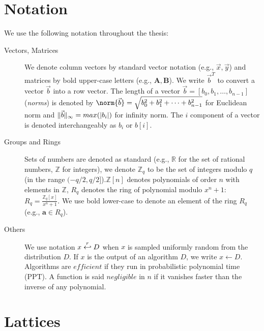 \section{Notation}
\label{sec:defGeneral}
We use the following notation throughout the thesis:
\begin{description}
\item[Vectors, Matrices] We denote column vectors by standard vector notation
  (e.g., \(\vec{x}, \vec{y}\)) and matrices by bold upper-case letters (e.g.,
  \(\mathbf{A}, \mathbf{B}\)). We write \(\vec{b}^{T}\) to convert a vector
  \(\vec{b}\) into a row vector. The length of a vector
  \(\vec{b} = [b_{0}, b_{1}, \dots, b_{n-1}]\) (\textit{norms}) is denoted by
  \(\norm{\vec{b}} = \sqrt{b_{0}^{2} + b_{1}^{2} + \dots + b_{n-1}^{2}}\) for
  Euclidean norm and \(\Vert \vec{b} \Vert_{\infty} = max(|b_{i}|)\) for infinity norm. The
  \(i\) component of a vector is denoted interchangeably as \(b_{i}\) or
  \(b[i]\).
\item[Groups and Rings] Sets of numbers are denoted as standard (e.g.,
  \(\mathbb{R}\) for the set of rational numbers, \(\mathbb{Z}\) for integers), we
  denote \(\mathbb{Z}_{q}\) to be the set of integers modulo \(q\) (in the range
  \((-q/2,q/2]\)).\(\mathbb{Z}[n]\) denotes polynomials of order \(n\) with
  elements in \(\mathbb{Z}\), \(R_{q}\) denotes the ring of polynomial modulo
  \(x^{n} + 1\): \(R_{q} = \frac{\mathbb{Z}_{q}[x]}{x^{n} + 1}\). We use bold
  lower-case to denote an element of the ring \(R_{q}\) (e.g.,
  \(\mathbf{a} \in R_q\)).
\item[Others] We use notation \(x \stackrel{r}{\hookleftarrow} D\) when \(x\) is sampled
  uniformly random from the distribution \(D\). If \(x\) is the output of an
  algorithm \(D\), we write \(x \gets D\). Algorithms are \(efficient\) if they
  run in probabilistic polynomial time (PPT). A function is said \(negligible\)
  in \(n\) if it vanishes faster than the inverse of any polynomial.
\end{description}

\section{Lattices}
\label{sec:defLattices}

